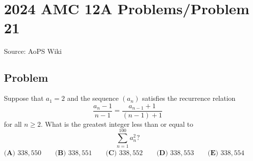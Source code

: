\documentclass[12pt]{article}
\begin{document}
\section*{{2024 AMC 12A Problems/Problem 21}}
Source: AoPS Wiki

\subsection*{Problem}
Suppose that $a_1 = 2$ and the sequence $(a_n)$ satisfies the recurrence relation \[\frac{a_n -1}{n-1}=\frac{a_{n-1}+1}{(n-1)+1}\] for all $n \ge 2.$ What is the greatest integer less than or equal to \[\sum^{100}_{n=1} a_n^2?\] $\textbf{(A) } 338{,}550 \qquad \textbf{(B) } 338{,}551 \qquad \textbf{(C) } 338{,}552 \qquad \textbf{(D) } 338{,}553 \qquad \textbf{(E) } 338{,}554$
\end{document}
